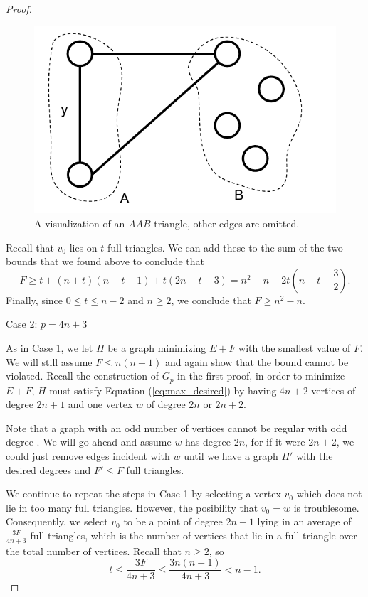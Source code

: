 \documentclass[10pt]{amsart}
\begin{document}
\begin{proof}
    \begin{figure}[h!]
        \centering
        \includegraphics[scale=.7]{../figures/aab_triangle.pdf}
        \caption{A visualization of an $AAB$ triangle, other edges are omitted.}
    \end{figure}

    Recall that $v_0$ lies on $t$ full triangles. We can add these to the sum of the two bounds that
    we found above to conclude that
    $$ F \ge t + (n + t)(n - t - 1) + t(2n - t - 3) = n^2 - n + 2t(n - t - \frac{3}{2}). $$
    Finally, since $0 \le t \le n - 2$ and $n \ge 2$, we conclude that $F \ge n^2 - n$.

    \noindent Case 2: $p = 4n + 3$

    As in Case 1, we let $H$ be a graph minimizing $E + F$ with the smallest value of $F$. We 
    will still assume $F \le n(n - 1)$ and again show that the bound cannot be violated. Recall 
    the construction of $G_p$ in the first proof, in order to minimize $E + F$, $H$ must satisfy
    Equation (\ref{eq:max_desired}) by having $4n + 2$ vertices of degree $2n + 1$ and one vertex 
    $w$ of degree $2n$ or $2n + 2$.
    
    Note that a graph with an odd number of vertices cannot be regular 
    with odd degree \cite[Cor. 2.1 (a)]{FH}. We will go ahead and assume $w$ has degree $2n$, for if it were 
    $2n + 2$, we could just remove edges incident with $w$ until we have a graph $H'$ with the desired 
    degrees and $F' \le F$ full triangles.

    We continue to repeat the steps in Case 1 by selecting a vertex $v_0$ which does not lie in too
    many full triangles. However, the posibility that $v_0 = w$ is troublesome. Consequently, we select 
    $v_0$ to be a point of degree $2n + 1$ lying in an average of $\frac{3F}{4n + 3}$ 
    full triangles, which is the number of vertices that lie in a full triangle over the total number
    of vertices. Recall that $n \ge 2$, so
    \begin{equation}
        t \le \frac{3F}{4n + 3} \le \frac{3n(n - 1)}{4n + 3} < n - 1 \label{eq:t_case_2}.
    \end{equation}


\end{proof}
\end{document}
